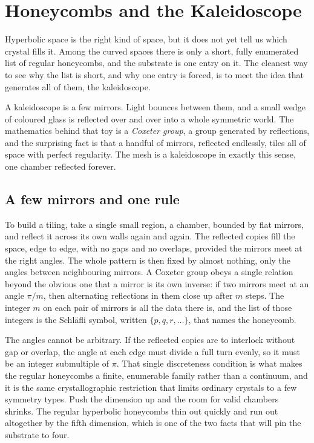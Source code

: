 \section{Honeycombs and the Kaleidoscope}

Hyperbolic space is the right kind of space, but it does not yet tell us which crystal fills it. Among the curved spaces there is only a short, fully enumerated list of regular honeycombs, and the substrate is one entry on it. The cleanest way to see why the list is short, and why one entry is forced, is to meet the idea that generates all of them, the kaleidoscope.

A kaleidoscope is a few mirrors. Light bounces between them, and a small wedge of coloured glass is reflected over and over into a whole symmetric world. The mathematics behind that toy is a \emph{Coxeter group}, a group generated by reflections, and the surprising fact is that a handful of mirrors, reflected endlessly, tiles all of space with perfect regularity. The mesh is a kaleidoscope in exactly this sense, one chamber reflected forever.

\subsection{A few mirrors and one rule}

To build a tiling, take a single small region, a chamber, bounded by flat mirrors, and reflect it across its own walls again and again. The reflected copies fill the space, edge to edge, with no gaps and no overlaps, provided the mirrors meet at the right angles. The whole pattern is then fixed by almost nothing, only the angles between neighbouring mirrors. A Coxeter group obeys a single relation beyond the obvious one that a mirror is its own inverse: if two mirrors meet at an angle $\pi/m$, then alternating reflections in them close up after $m$ steps. The integer $m$ on each pair of mirrors is all the data there is, and the list of those integers is the Schl\"afli symbol, written $\{p, q, r, \dots\}$, that names the honeycomb.

The angles cannot be arbitrary. If the reflected copies are to interlock without gap or overlap, the angle at each edge must divide a full turn evenly, so it must be an integer submultiple of $\pi$. That single discreteness condition is what makes the regular honeycombs a finite, enumerable family rather than a continuum, and it is the same crystallographic restriction that limits ordinary crystals to a few symmetry types. Push the dimension up and the room for valid chambers shrinks. The regular hyperbolic honeycombs thin out quickly and run out altogether by the fifth dimension, which is one of the two facts that will pin the substrate to four.

